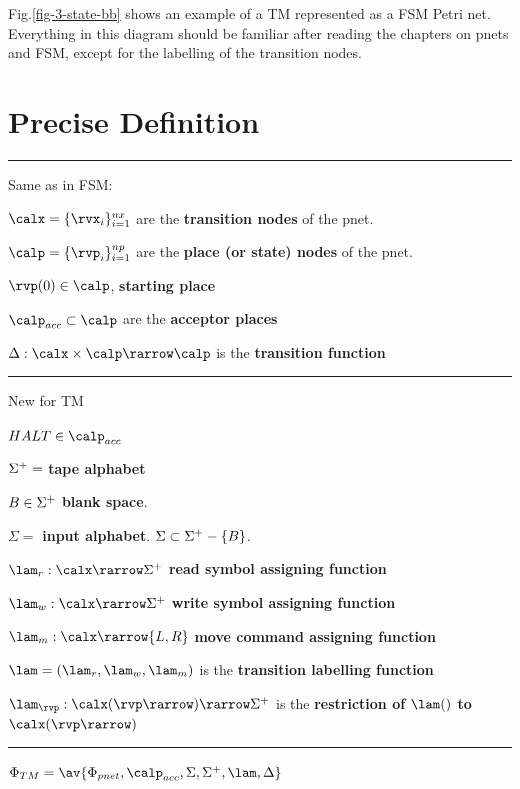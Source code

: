 Fig.\ref{fig-3-state-bb} shows an example of
a TM represented as a FSM Petri net. Everything in this diagram
should be familiar after reading the chapters
on pnets and FSM, except for the labelling of the 
transition nodes.



\section{Precise Definition}

\hrule
Same as in FSM:

$\calx =\{\rvx_i\}_{i=1}^{nx}$ are the {\bf transition nodes} of the pnet.

$\calp =\{\rvp_i\}_{i=1}^{np}$ are the {\bf place (or state) nodes} of the pnet.

$\rvp(0)\in \calp$, {\bf starting place }

$\calp_{acc}\subset \calp$ are the 
{\bf acceptor places}

$\Delta:\calx\times\calp\rarrow \calp$ is the 
{\bf transition function}
\hrule
New for TM

$HALT\in \calp_{acc}$

$\Sigma^+ =$ {\bf tape alphabet}

$B\in \Sigma^+$ {\bf blank space}.

$\Sigma=$ {\bf input alphabet}. $\Sigma\subset\Sigma^+-\{B\}$. 

$\lam_{r}:\calx\rarrow \TA$ {\bf read symbol assigning function}

$\lam_{w}:\calx\rarrow \TA$ {\bf write symbol assigning function}

$\lam_{m}:\calx\rarrow \{L,R\}$ {\bf move command
assigning function}

$\lam = (\lam_r, \lam_w, \lam_m)$ is the
{\bf transition labelling function}

$\lam_\rvp: \calx(\rvp\rarrow)\rarrow \TA$ is the
{\bf restriction of $\lam()$ to $\calx(\rvp\rarrow)$}

\hrule
$\Phi_{TM}=\av{\Phi_{pnet},\calp_{acc}, \Sigma,
\Sigma^+, \lam, \Delta}$




